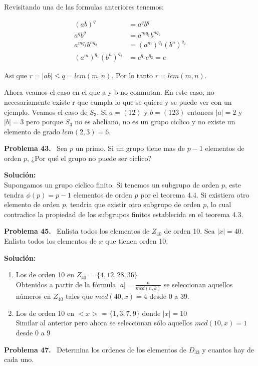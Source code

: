 \documentclass{article}
\newcounter{problem}
\newcounter{solution}
\newcommand\Problem[1]{%
  \stepcounter{problem}%
  \textbf{Problema #1.}~%
  \setcounter{solution}{0}%
}
\newcommand\TheSolution{%
  \textbf{Solución:}\\%
}
\begin{document}
Revisitando una de las formulas anteriores tenemos:

\[
\begin{align}
  {(ab)}^{q} &= a^{q} b^{q} \\
  a^{q} b^{q} &= a^{m q_{1}} b^{n q_{2}} \\
  a^{m q_{1}} b^{n q_{2}} &= {(a^{m})}^{q_{1}} {(b^{n})}^{q_{2}} \\
  {(a^{m})}^{q_{1}} {(b^{n})}^{q_{2}} &= e^{q_{1}} e^{q_{2}} = e
\end{align}
\]

Asi que $r = |ab| \leq q = lcm(m, n)$. Por lo tanto $r = lcm(m, n)$.

Ahora veamos el caso en el que a y b no conmutan.
En este caso, no necesariamente existe r que cumpla lo que se quiere
y se puede ver con un ejemplo.
Veamos el caso de $S_{3}$.
Si $a = (12)$ y $b = (123)$ entonces $|a| = 2$ y $|b| = 3$
pero porque $S_{3}$ no es abeliano, no es un grupo ciclico y no existe un elemento
de grado $lcm(2, 3) = 6$.

\Problem{43} Sea $p$ un primo. Si un grupo tiene mas de $p - 1$ elementos de
orden $p$, ¿Por qué el grupo no puede ser ciclico?

\TheSolution{}
Supongamos un grupo ciclico finito. Si tenemos un subgrupo de orden
$p$, este tendra $\phi(p) = p - 1$ elementos de orden $p$ por el teorema 4.4.
Si existiera otro elemento de orden $p$, tendria que existir otro subgrupo de
orden $p$, lo cual contradice la propiedad de los subgrupos finitos
establecida en el teorema 4.3.

\Problem{45} Enlista todos los elementos de $Z_{40}$ de orden 10. Sea $|x| = 
40$. Enlista todos los elementos de $x$ que tienen orden 10.

\TheSolution{}
\begin{enumerate}
  \item Los de orden 10 en $Z_{40}$ = $\{4,12,28,36\}$ \\
    Obtenidos a partir de la f\'ormula $|a| = \frac{n}{mcd(n, k)}$ se
    seleccionan aquellos n\'umeros en $Z_{40}$ tales que $mcd(40, x) = 4$
    desde 0 a 39.
  \item Los de orden 10 en $<x>$ = $\{1,3,7,9\}$ donde $|x| = 10$ \\
    Similar al anterior pero ahora se seleccionan sólo aquellos $mcd(10, x) =
    1$ desde 0 a 9
\end{enumerate}


\Problem{47} Determina los ordenes de los elementos de $D_{33}$ y cuantos hay
de cada uno.
\end{document}
